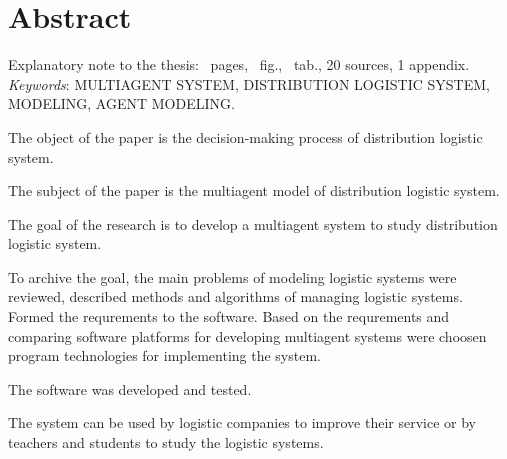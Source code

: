 \section*{Abstract}
Explanatory note to the thesis: \pageref{LastPage}~pages, \totalfigures~fig., \totaltables~tab., 20 sources, 1 appendix. \bigbreak 
\textit{Keywords}: \MakeUppercase{multiagent system, distribution logistic system, modeling, agent modeling}. \bigbreak 

The object of the paper is the decision-making process of distribution logistic system.

The subject of the paper is the multiagent model of  distribution logistic system.

The goal of the research is to develop a multiagent system to study distribution logistic system.

To archive the goal, the main problems of modeling logistic systems were reviewed, described methods and algorithms of managing logistic systems.
Formed the requrements to the software.
Based on the requrements and comparing software platforms for developing multiagent systems were choosen program technologies for implementing the system. 

The software was developed and tested.

The system can be used by logistic companies to improve their service or by teachers and students to study the logistic systems.
